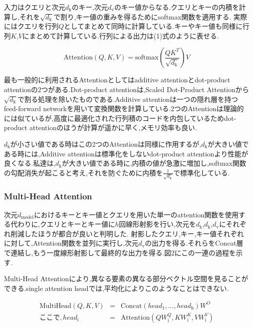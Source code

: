 \documentclass{jarticle}     %
\begin{document}
入力はクエリと次元$d_\mathrm{k}$のキー,次元$d_\mathrm{v}$のキー値からなる.クエリとキーの内積を計算し,それを$\sqrt{d_\mathrm{k}}$で割り,キー値の重みを得るためにsoftmax関数を適用する.
実際にはクエリを行列$Q$としてまとめて同時に計算している.キーやキー値も同様に行列$K$,$V$にまとめて計算している.行列による出力は(1)式のように表せる.

\begin{equation}
  \mathrm{Attention}(Q,K,V) = \mathrm{softmax}(\frac{QK^T}{\sqrt{d_\mathrm{k}}})V
\end{equation}

\par

最も一般的に利用されるAttentionとしてはadditive attentionとdot-product attentionの2つがある.Dot-product attentionは,Scaled Dot-Product Attentionから$\sqrt{d_\mathrm{k}}$で割る処理を除いたものである.Additive attentionは一つの隠れ層を持つfeed-forward networkを用いて変換関数を計算している.2つのAttentionは理論的には似ているが,高度に最適化された行列積のコードを内包しているためdot-product attentionのほうが計算が遥かに早く,メモリ効率も良い.\par
$d_\mathrm{k}$が小さい値である時はこの2つのAttentionは同様に作用するが,$d_\mathrm{k}$が大きい値である時には,Additive attentionは標準化をしないdot-product attentionより性能が良くなる.私達は,$d_\mathrm{k}$が大きい値である時に,内積の値が急激に増加し,softmax関数の勾配消失が起こると考え,それを防ぐために内積を$\frac{1}{\sqrt{d_\mathrm{k}}}$で標準化している.

\subsubsection{Multi-Head Attention}
次元$d_\mathrm{model}$におけるキーとキー値とクエリを用いた単一のattention関数を使用する代わりに,クエリとキーとキー値に$h$回線形射影を行い,次元を$d_\mathrm{k}$,$d_\mathrm{k}$,$d_\mathrm{v}$にそれぞれ削減したほうが都合が良いと判明した.
射影したクエリ,キー,キー値それぞれに対して,Attention関数を並列に実行し,次元$d_\mathrm{v}$の出力を得る.それらをConcat層で連結し,もう一度線形射影して最終的な出力を得る.図2にこの一連の過程を示す.
\par
Multi-Head Attentionにより,異なる要素の異なる部分ベクトル空間を見ることができる.single attention headでは,平均化によりこのようなことはできない.
\par
\begin{eqnarray*}
  \mathrm{MultiHead}(Q,K,V)&  = & \mathrm{Concat}(head_\mathrm{1},...,head_\mathrm{h})W^O   \\
  ここで, head_\mathrm{i} & = & \mathrm{Attention}(QW_\mathrm{i}^Q,KW_\mathrm{i}^K,VW_\mathrm{i}^V)
\end{eqnarray*}
\end{document}
